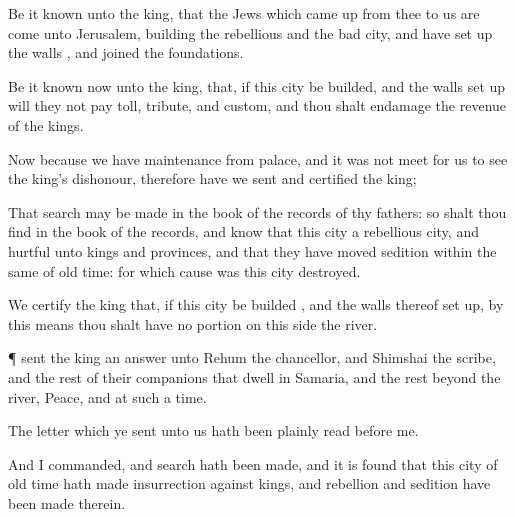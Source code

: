 {Be
it
known unto the
king, that the
Jews
which came
up
from
thee to
us are
come unto
Jerusalem,
building the
rebellious and the
bad
city, and have set
up the
walls
{}, and
joined the
foundations.

Be it
known
now unto the
king, that,
if
this
city be
builded, and the
walls set
up
{} will they
not
pay
toll,
tribute, and
custom, and
{} thou shalt
endamage the
revenue of the
kings.

Now
because we
have
maintenance from
{}
palace, and it was
not
meet for us to
see the
king’s
dishonour,
therefore have we
sent and
certified the
king;

That
search may be made in the
book of the
records of thy
fathers: so shalt thou
find in the
book of the
records, and
know that
this
city
{} a
rebellious
city, and
hurtful unto
kings and
provinces, and that they have
moved
sedition within the
same
of
old
time:
for
which cause was
this
city
destroyed.

We
certify the
king that,
if
this
city be
builded
{}, and the
walls thereof set
up, by
this
means thou shalt
have
no
portion on this
side the
river.


\par }{\PP {}¶
{}
sent the
king an
answer
unto
Rehum the
chancellor, and
{}
Shimshai the
scribe, and
{} the
rest of their
companions that
dwell in
Samaria, and
{} the
rest
beyond the
river,
Peace, and at such a
time.

The
letter which ye
sent unto
us hath been
plainly
read
before me.

And
I
commanded, and
search hath been made, and it is
found that
this
city
of
old
time hath made
insurrection
against
kings, and
{}
rebellion and
sedition have been
made therein.

}
